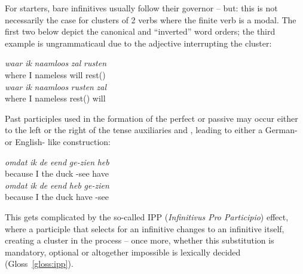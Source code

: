 For starters, bare infinitives usually follow their governor -- but: this is not necessarily the case for clusters of 2 verbs where the finite verb is a modal.
The first two  below depict the canonical and ``inverted'' word orders; the third example is ungrammaticaul due to the adjective  interrupting the cluster:
\begin{exe}
\ex\label{gloss:rusten_zal}
\begin{xlist}
\ex
\gll \textit{waar} \textit{ik} \textit{naamloos} \textit{zal} \textit{rusten}\\
where I nameless will rest()\\
\ex
\gll \textit{waar} \textit{ik} \textit{naamloos} \textit{rusten} \textit{zal}\footnotemark\\
where I nameless rest() will\\
\end{xlist}
\end{exe}
Past participles used in the formation of the perfect or passive may occur either to the left or the right of the tense auxiliaries  and , leading to either a German- or English- like construction:
\begin{exe}
\ex\label{gloss:green_vs_red}
\begin{xlist}
\ex
\gll \textit{omdat} \textit{ik} \textit{de} \textit{eend} \textit{ge-zien} \textit{heb}\\
because I the duck -see have\\
\ex
\gll \textit{omdat} \textit{ik} \textit{de} \textit{eend} \textit{heb} \textit{ge-zien}\\
because I the duck have -see\\
\end{xlist}
\end{exe}
This gets complicated by the so-called IPP (\textit{Infinitivus Pro Participio}) effect, where a participle that selects for an infinitive changes to an infinitive itself, creating a cluster in the process -- once more, whether this substitution is mandatory, optional or altogether impossible is lexically decided (Gloss~\ref{gloss:ipp}).
